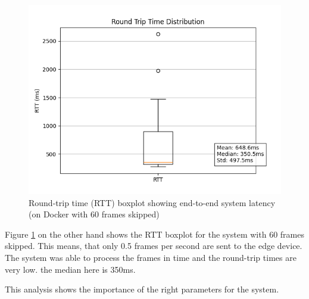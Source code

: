 \documentclass[conference]{IEEEtran}
\begin{document}
\begin{figure}[!htbp]
    \centering
    \includegraphics[width=1\linewidth]{./res/rtt_distribution-docker_test-60skip.png}
    \caption{Round-trip time (RTT) boxplot showing end-to-end system latency (on Docker with 60 frames skipped)}
    \label{fig:rtt_distribution_docker60}
\end{figure}

Figure \ref{fig:rtt_distribution_docker60} on the other hand shows the RTT boxplot for the system with 60 frames skipped. This means, that only 0.5 frames per second are sent to the edge device. The system was able to process the frames in time and the round-trip times are very low. the median here is 350ms. 

This analysis shows the importance of the right parameters for the system. 
\end{document}
